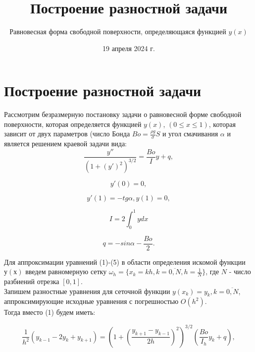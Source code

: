 \documentclass{article}
\title{Построение разностной задачи}
\author{Равновесная форма свободной поверхности, определяющаяся функцией $y(x)$}
\date{19 апреля 2024 г.}
\begin{document}
\maketitle

\section{Построение разностной задачи}

Рассмотрим безразмерную постановку задачи о равновесной форме свободной поверхности, которая определяется функцией $y(x)$, $(0 \leq x \leq 1)$, которая зависит от двух параметров (число Бонда $Bo = \frac{\rho g}{\sigma}S$ и угол смачивания $\alpha$ и является решением краевой задачи вида: \\

\begin{equation}
    \frac{y''}{(1+(y')^2)^{3/2}} = \frac{Bo}{I}y + q,
\end{equation}

\begin{equation}
    y'(0) = 0,
\end{equation}

\begin{equation}
    y'(1) = -tg\alpha, y(1) = 0,
\end{equation}

\begin{equation}
    I = 2\int_0^1 y dx
\end{equation}

\begin{equation}
    q = -sin\alpha - \frac{Bo}{2}.
\end{equation}

Для аппроксимации уравнений (1)-(5) в области определения искомой функции $у(х)$ введем равномерную сетку $\omega_{h} = \{x_k = kh, k = \overline{0,N}, h = \frac{1}{N}  \}$, где $N$ - число разбиений отрезка $[0,1]$.\\

Запишем разностные уравнения для сеточной функции $y(x_k) = y_k, k =  \overline{0,N}$, аппроксимирующие исходные уравнения с погрешностью $O(h^2)$.\\

Тогда вместо (1) будем иметь:

\begin{equation}
    \frac{1}{h^2}(y_{k-1} - 2y_k + y_{k+1}) = \left(1 + \left(\frac{y_{k+1} - y_{k-1}}{2h}\right)^{2}\right)^{3/2} \left(\frac{Bo}{I_h}y_k + q\right), 
\end{equation}
\end{document}
